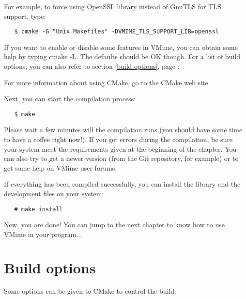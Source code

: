 For example, to force using OpenSSL library instead of GnuTLS for TLS
support, type:

\begin{verbatim}
   $ cmake -G "Unix Makefiles" -DVMIME_TLS_SUPPORT_LIB=openssl
\end{verbatim}

If you want to enable or disable some features in VMime, you can obtain some
help by typing {\vcode cmake -L}. The defaults should be OK though. For a list
of build options, you can also refer to section \ref{build-options}, page
\pageref{build-options}.

For more information about using CMake, go to
\href{http://www.cmake.org/}{the CMake web site}.

Next, you can start the compilation process:

\begin{verbatim}
   $ make
\end{verbatim}

Please wait a few minutes will the compilation runs (you should have some time
to have a coffee right now!). If you get errors during the compilation, be
sure your system meet the requirements given at the beginning of the chapter.
You can also try to get a newer version (from the Git repository, for example)
or to get some help on VMime user forums.

If everything has been compiled successfully, you can install the library and
the development files on your system:

\begin{verbatim}
   # make install
\end{verbatim}


Now, you are done! You can jump to the next chapter to know how to use VMime
in your program...

\section{\label{build-options}Build options}

Some options can be given to CMake to control the build:

